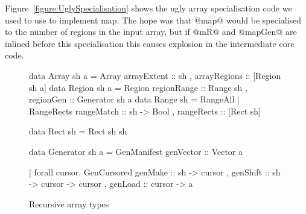 


Figure~\ref{figure:UglySpecialisation} shows the ugly array specialisation code we used to use to implement map. The hope was that @map@ would be specialised to the number of regions in the input array, but if @mR@ and @mapGen@ are inlined before this specialisation this causes explosion in the intermediate core code.


\begin{figure}
\begin{small}
\begin{code}
data Array sh a
  = Array        { arrayExtent   :: sh
                 , arrayRegions  :: [Region sh a] }
data Region sh a
  = Region       { regionRange   :: Range sh
                 , regionGen     :: Generator sh a }
data Range sh
  = RangeAll
  | RangeRects   { rangeMatch    :: sh -> Bool
                 , rangeRects    :: [Rect sh] }

data Rect sh   = Rect sh sh

data Generator sh a
  = GenManifest  { genVector :: Vector a }

  | forall cursor.
    GenCursored  { genMake   :: sh -> cursor
                 , genShift  :: sh -> cursor -> cursor
                 , genLoad   :: cursor -> a }
\end{code}
\end{small}
\caption{Recursive array types}
\end{figure}

